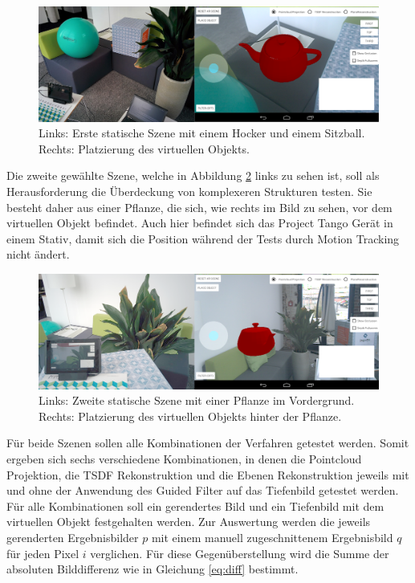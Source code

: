 \begin{figure}[h]
  \centering
	\includegraphics[width=1.0\textwidth]{content/images/evaluation/static-scene.png} 
  \caption{Links: Erste statische Szene mit einem Hocker und einem Sitzball. Rechts: Platzierung des virtuellen Objekts. }
  \label{fig:static-scene}
\end{figure}

Die zweite gewählte Szene, welche in Abbildung \ref{fig:plant-scene} links zu sehen ist, soll als Herausforderung die Überdeckung von komplexeren Strukturen testen. Sie besteht daher aus einer Pflanze, die sich, wie rechts im Bild zu sehen, vor dem virtuellen Objekt befindet. Auch hier befindet sich das Project Tango Gerät in einem Stativ, damit sich die Position während der Tests durch Motion Tracking nicht ändert. \\

\begin{figure}[h]
  \centering
	\includegraphics[width=1.0\textwidth]{content/images/evaluation/plant-scene.png} 
  \caption{Links: Zweite statische Szene mit einer Pflanze im Vordergrund. Rechts: Platzierung des virtuellen Objekts hinter der Pflanze. }
  \label{fig:plant-scene}
\end{figure}

Für beide Szenen sollen alle Kombinationen der Verfahren getestet werden. Somit ergeben sich sechs verschiedene Kombinationen, in denen die Pointcloud Projektion, die TSDF Rekonstruktion und die Ebenen Rekonstruktion jeweils mit und ohne der Anwendung des Guided Filter auf das Tiefenbild getestet werden. Für alle Kombinationen soll ein gerendertes Bild und ein Tiefenbild mit dem virtuellen Objekt festgehalten werden. Zur Auswertung werden die jeweils gerenderten Ergebnisbilder \(p\) mit einem manuell zugeschnittenem Ergebnisbild  \(q\) für jeden Pixel \(i\) verglichen. Für diese Gegenüberstellung wird die Summe der absoluten Bilddifferenz wie in Gleichung \ref{eq:diff} bestimmt.

